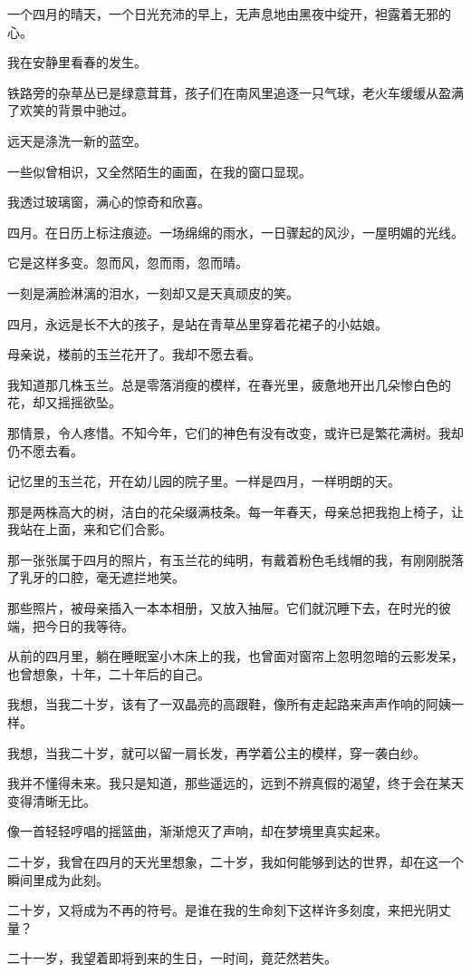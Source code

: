 \documentclass[12pt,a4paper]{article}
\def\blankrev{\vspace{1ex}}									%
\begin{document}
		\blankrev
		一个四月的晴天，一个日光充沛的早上，无声息地由黑夜中绽开，袒露着无邪的心。\par
		我在安静里看春的发生。\par
		铁路旁的杂草丛已是绿意茸茸，孩子们在南风里追逐一只气球，老火车缓缓从盈满了欢笑的背景中驰过。\par
		远天是涤洗一新的蓝空。\par
		一些似曾相识，又全然陌生的画面，在我的窗口显现。\par
		我透过玻璃窗，满心的惊奇和欣喜。\par
		四月。在日历上标注痕迹。一场绵绵的雨水，一日骤起的风沙，一屋明媚的光线。\par
		它是这样多变。忽而风，忽而雨，忽而晴。\par
		一刻是满脸淋漓的泪水，一刻却又是天真顽皮的笑。\par
		四月，永远是长不大的孩子，是站在青草丛里穿着花裙子的小姑娘。

		\blankrev
		母亲说，楼前的玉兰花开了。我却不愿去看。\par
		我知道那几株玉兰。总是零落消瘦的模样，在春光里，疲惫地开出几朵惨白色的花，却又摇摇欲坠。\par
		那情景，令人疼惜。不知今年，它们的神色有没有改变，或许已是繁花满树。我却仍不愿去看。\par
		记忆里的玉兰花，开在幼儿园的院子里。一样是四月，一样明朗的天。\par
		那是两株高大的树，洁白的花朵缀满枝条。每一年春天，母亲总把我抱上椅子，让我站在上面，来和它们合影。\par
		那一张张属于四月的照片，有玉兰花的纯明，有戴着粉色毛线帽的我，有刚刚脱落了乳牙的口腔，毫无遮拦地笑。\par
		那些照片，被母亲插入一本本相册，又放入抽屉。它们就沉睡下去，在时光的彼端，把今日的我等待。\par
		从前的四月里，躺在睡眠室小木床上的我，也曾面对窗帘上忽明忽暗的云影发呆，也曾想象，十年，二十年后的自己。\par
		我想，当我二十岁，该有了一双晶亮的高跟鞋，像所有走起路来声声作响的阿姨一样。\par
		我想，当我二十岁，就可以留一肩长发，再学着公主的模样，穿一袭白纱。\par
		我并不懂得未来。我只是知道，那些遥远的，远到不辨真假的渴望，终于会在某天变得清晰无比。\par
		像一首轻轻哼唱的摇篮曲，渐渐熄灭了声响，却在梦境里真实起来。\par
		二十岁，我曾在四月的天光里想象，二十岁，我如何能够到达的世界，却在这一个瞬间里成为此刻。\par
		二十岁，又将成为不再的符号。是谁在我的生命刻下这样许多刻度，来把光阴丈量？\par
		二十一岁，我望着即将到来的生日，一时间，竟茫然若失。
\end{document}
